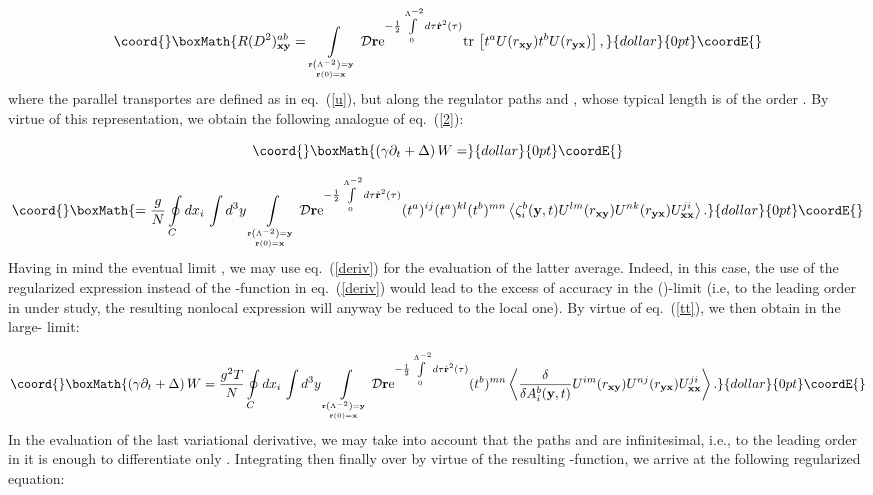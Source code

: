 \documentclass[a4paper,12pt]{article}
\begin{document}
$$\coord{}\boxMath{
R(D^2)_{\bf xy}^{ab}=\int\limits_{{{\bf r}\left(\Lambda^{-2}\right)={\bf y}}\atop
{{\bf r}(0)={\bf x}}}^{}{\cal D}{\bf r}
{\rm e}^{-\frac12\int\limits_{0}^{\Lambda^{-2}}d\tau\dot{\bf r}^2(\tau)}{\rm tr}{\,}\left[t^aU(r_{\bf xy})t^b
U(r_{\bf yx})\right],}{dollar}{0pt}\coordE{}$$
where the parallel transportes are defined as in eq.~(\ref{u}), but along the regulator paths \coordHE{} and
\coordHE{}, whose typical length is of the order \coordHE{}. By virtue of this representation, we obtain the
following analogue of eq.~(\ref{2}):

$$\coord{}\boxMath{\left(\gamma\partial_t+\Delta\right)W=}{dollar}{0pt}\coordE{}$$

$$\coord{}\boxMath{=\frac{g}{N}
\oint\limits_{C}^{} dx_i{\,}\int d^3y\int\limits_{{{\bf r}\left(\Lambda^{-2}\right)={\bf y}}\atop
{{\bf r}(0)={\bf x}}}^{}
{\cal D}{\bf r}
{\rm e}^{-\frac12\int\limits_{0}^{\Lambda^{-2}}d\tau\dot{\bf r}^2(\tau)}
(t^a)^{ij}(t^a)^{kl}(t^b)^{mn}\left<\zeta_i^b({\bf y},t)U^{lm}(r_{\bf xy})U^{nk}(r_{\bf yx})U_{\bf xx}^{ji}\right>.}{dollar}{0pt}\coordE{}$$
Having in mind the eventual limit \myHighlight{$\Lambda\to\infty$}\coordHE{}, we may use eq.~(\ref{deriv}) for the evaluation of the latter average.
Indeed, in this case, the use of the regularized expression instead of the \myHighlight{$\delta$}\coordHE{}-function in eq.~(\ref{deriv}) would lead
to the excess of accuracy in the (\myHighlight{$\Lambda\to\infty$}\coordHE{})-limit (i.e, to the leading order in \coordHE{} under study,
the resulting nonlocal expression will anyway be reduced
to the local one). By virtue of eq.~(\ref{tt}), we then obtain in the
large-\coordHE{} limit:

$$\coord{}\boxMath{\left(\gamma\partial_t+\Delta\right)W=\frac{g^2T}{N}
\oint\limits_{C}^{} dx_i{\,}\int d^3y\int\limits_{{{\bf r}\left(\Lambda^{-2}\right)={\bf y}}\atop
{{\bf r}(0)={\bf x}}}^{}
{\cal D}{\bf r}
{\rm e}^{-\frac12\int\limits_{0}^{\Lambda^{-2}}d\tau\dot{\bf r}^2(\tau)}
(t^b)^{mn}\left<\frac{\delta}{\delta A_i^b({\bf y},t)}U^{im}(r_{\bf xy})U^{nj}(r_{\bf yx})U_{\bf xx}^{ji}\right>.}{dollar}{0pt}\coordE{}$$
In the evaluation of the last variational derivative, we may take
into account that the paths \coordHE{} and \coordHE{} are infinitesimal, i.e., to the leading order in
\coordHE{} it is enough to differentiate only \coordHE{}. Integrating then finally over \coordHE{} by virtue
of the resulting \myHighlight{$\delta$}\coordHE{}-function, we arrive at the following regularized equation:
\end{document}

